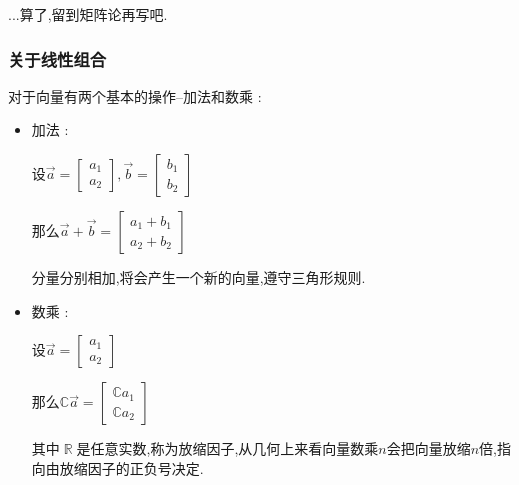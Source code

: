 \documentclass[UTF8,12pt]{ctexbook}
\newcommand{\mathConstant}{\mathbb{C}}
\DeclareMathOperator{\mathRealNumberCollection}{\mathbb{R}}
\begin{document}
{{{{{    ...算了,留到矩阵论再写吧.
  }%

  \subsubsection{关于线性组合}{
    对于向量有两个基本的操作--加法和数乘 :

    \begin{itemize}
      \item {
            加法 :

            设$\vec{a} = \begin{bmatrix}
                a_1 \\
                a_2
              \end{bmatrix},\vec{b} = \begin{bmatrix}
                b_1 \\
                b_2
              \end{bmatrix}$

            那么$\vec{a} + \vec{b} = \begin{bmatrix}
                a_1 + b_1 \\
                a_2 + b_2
              \end{bmatrix}$

            分量分别相加,将会产生一个新的向量,遵守三角形规则.
            }
      \item {
            数乘 :

            设$\vec{a} = \begin{bmatrix}
                a_1 \\
                a_2
              \end{bmatrix}$

            那么$\mathConstant\vec{a} = \begin{bmatrix}
                \mathConstant a_1 \\
                \mathConstant a_2
              \end{bmatrix}$

            其中$\mathRealNumberCollection$是任意实数,称为放缩因子,从几何上来看向量数乘$n$会把向量放缩$n$倍,指向由放缩因子的正负号决定.
            }
    \end{itemize}

}}}}}
\end{document}
